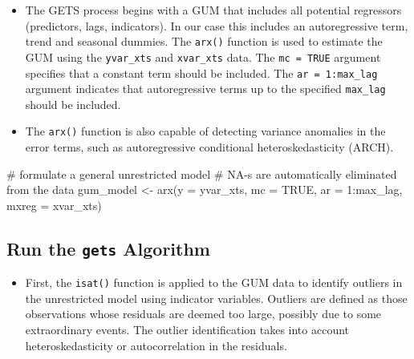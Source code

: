 \documentclass[
  letterpaper,
  DIV=11,
  numbers=noendperiod]{scrreport}
\newenvironment{Shaded}{\begin{snugshade}}{\end{snugshade}}
\newcommand{\AttributeTok}[1]{\textcolor[rgb]{0.40,0.45,0.13}{#1}}
\newcommand{\CommentTok}[1]{\textcolor[rgb]{0.37,0.37,0.37}{#1}}
\newcommand{\ConstantTok}[1]{\textcolor[rgb]{0.56,0.35,0.01}{#1}}
\newcommand{\DecValTok}[1]{\textcolor[rgb]{0.68,0.00,0.00}{#1}}
\newcommand{\FunctionTok}[1]{\textcolor[rgb]{0.28,0.35,0.67}{#1}}
\newcommand{\NormalTok}[1]{\textcolor[rgb]{0.00,0.23,0.31}{#1}}
\newcommand{\OtherTok}[1]{\textcolor[rgb]{0.00,0.23,0.31}{#1}}
\newcommand{\SpecialCharTok}[1]{\textcolor[rgb]{0.37,0.37,0.37}{#1}}
\providecommand{\tightlist}{%
  \setlength{\itemsep}{0pt}\setlength{\parskip}{0pt}}\usepackage{longtable,booktabs,array}
\begin{document}
\begin{itemize}
\tightlist
\item
  The GETS process begins with a GUM that includes all potential
  regressors (predictors, lags, indicators). In our case this includes
  an autoregressive term, trend and seasonal dummies. The \texttt{arx()}
  function is used to estimate the GUM using the \texttt{yvar\_xts} and
  \texttt{xvar\_xts} data. The \texttt{mc\ =\ TRUE} argument specifies
  that a constant term should be included. The
  \texttt{ar\ =\ 1:max\_lag} argument indicates that autoregressive
  terms up to the specified \texttt{max\_lag} should be included.
\item
  The \texttt{arx()} function is also capable of detecting variance
  anomalies in the error terms, such as autoregressive conditional
  heteroskedasticity (ARCH).
\end{itemize}

\begin{Shaded}
\begin{Highlighting}[]
\CommentTok{\# formulate a general unrestricted model}
\CommentTok{\# NA{-}s are automatically eliminated from the data}
\NormalTok{  gum\_model }\OtherTok{\textless{}{-}} \FunctionTok{arx}\NormalTok{(}\AttributeTok{y =}\NormalTok{ yvar\_xts, }\AttributeTok{mc =} \ConstantTok{TRUE}\NormalTok{, }\AttributeTok{ar =} \DecValTok{1}\SpecialCharTok{:}\NormalTok{max\_lag, }\AttributeTok{mxreg =}\NormalTok{ xvar\_xts)}
\end{Highlighting}
\end{Shaded}

\subsection{\texorpdfstring{Run the \texttt{gets}
Algorithm}{Run the gets Algorithm}}\label{run-the-gets-algorithm}

\begin{itemize}
\tightlist
\item
  First, the \texttt{isat()} function is applied to the GUM data to
  identify outliers in the unrestricted model using indicator variables.
  Outliers are defined as those observations whose residuals are deemed
  too large, possibly due to some extraordinary events. The outlier
  identification takes into account heteroskedasticity or
  autocorrelation in the residuals.
\end{itemize}
\end{document}
